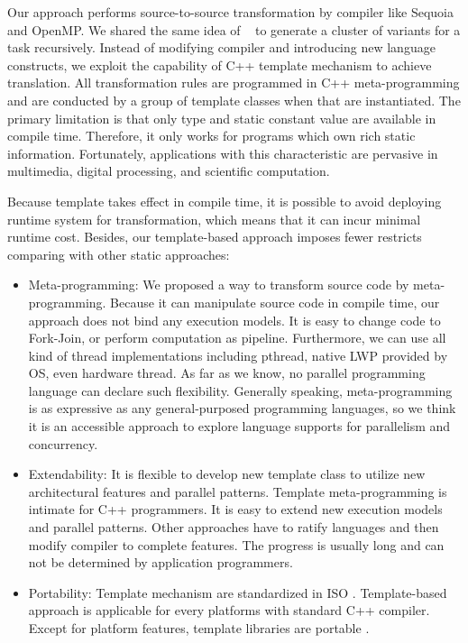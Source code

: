 \documentclass[10pt, conference, compsocconf]{IEEEtran}
\begin{document}
Our approach performs source-to-source transformation by compiler like
Sequoia and OpenMP. We shared the same idea of  ~\cite{sequoia, merge} to
generate a cluster of variants for a task recursively. Instead of
modifying compiler and introducing new language constructs, we exploit
the capability of C++ template mechanism to achieve translation. All
transformation rules are programmed in C++ meta-programming \cite{tempmetaprog} and are conducted by a group of template classes when that are instantiated. The primary limitation is that only type and static constant value are available in compile time. Therefore, it only works for programs which own rich static information. Fortunately, applications with this characteristic are pervasive in multimedia, digital processing, and scientific computation.

Because template takes effect in compile time, it is possible to avoid
deploying runtime system for transformation, which means that it can incur minimal
runtime cost. Besides, our template-based approach imposes fewer restricts comparing with other static approaches:

\begin{itemize}
\item Meta-programming: We proposed a way to transform source code by
meta-programming. Because it can manipulate source code in compile
time,  our approach does not bind any execution models. It is easy to
change code to Fork-Join, or perform computation
as pipeline. Furthermore, we can use all kind of thread
implementations including pthread, native LWP provided by OS, even
hardware thread. As far as we know, no parallel programming language
can declare such flexibility. Generally speaking, meta-programming is
as expressive as any general-purposed programming languages, so we think it is an accessible  approach to explore language
supports for parallelism and concurrency.

\item Extendability:  It is flexible to develop new template class to
  utilize new architectural features  and parallel patterns. Template
  meta-programming is intimate for C++ programmers. It is easy to
  extend new execution models and parallel patterns. Other approaches
  have to ratify languages and then modify compiler to complete
  features. The progress is usually long and can not be determined by
  application programmers.

\item Portability: Template mechanism are standardized in ISO
  \cite{c++03, c++0x}. Template-based approach is applicable for every
  platforms with standard C++ compiler. Except for platform features,
  template libraries are portable . 
\end{itemize}
\end{document}

